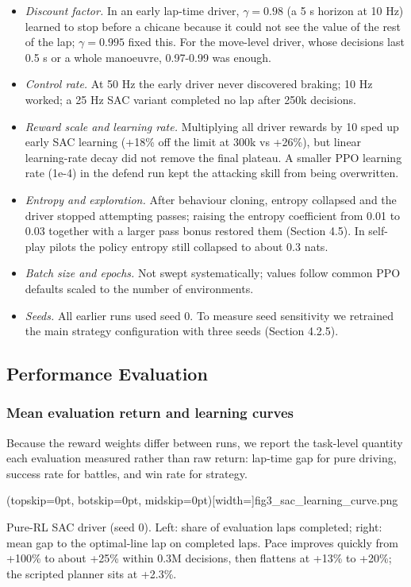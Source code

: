 \documentclass{ieeeaccess}
\providecommand{\tightlist}{\setlength{\itemsep}{0pt}\setlength{\parskip}{0pt}}
\begin{document}
\begin{itemize}
\tightlist
\item
  \emph{Discount factor.} In an early lap-time driver, \(\gamma=0.98\) (a 5 s horizon at
  10 Hz) learned to stop before a chicane because it could not see the value of the
  rest of the lap; \(\gamma=0.995\) fixed this. For the move-level driver, whose
  decisions last 0.5 s or a whole manoeuvre, 0.97-0.99 was enough.
\item
  \emph{Control rate.} At 50 Hz the early driver never discovered braking; 10 Hz worked;
  a 25 Hz SAC variant completed no lap after 250k decisions.
\item
  \emph{Reward scale and learning rate.} Multiplying all driver rewards by 10 sped up
  early SAC learning (+18\% off the limit at 300k vs +26\%), but linear learning-rate
  decay did not remove the final plateau. A smaller PPO learning rate (1e-4) in the
  defend run kept the attacking skill from being overwritten.
\item
  \emph{Entropy and exploration.} After behaviour cloning, entropy collapsed and the
  driver stopped attempting passes; raising the entropy coefficient from 0.01 to
  0.03 together with a larger pass bonus restored them (Section 4.5). In self-play
  pilots the policy entropy still collapsed to about 0.3 nats.
\item
  \emph{Batch size and epochs.} Not swept systematically; values follow common PPO
  defaults scaled to the number of environments.
\item
  \emph{Seeds.} All earlier runs used seed 0. To measure seed sensitivity we retrained
  the main strategy configuration with three seeds (Section 4.2.5).
\end{itemize}

\subsection{Performance Evaluation}

\subsubsection{Mean evaluation return and learning curves}

Because the reward weights differ between runs, we report the task-level quantity
each evaluation measured rather than raw return: lap-time gap for pure driving,
success rate for battles, and win rate for strategy.

\Figure[t!](topskip=0pt, botskip=0pt, midskip=0pt)[width=\textwidth]{fig3_sac_learning_curve.png}
{\parbox{0.92\textwidth}{Pure-RL SAC driver (seed 0). Left: share of evaluation laps completed; right: mean gap to the optimal-line lap on completed laps. Pace improves quickly from +100\% to about +25\% within 0.3M decisions, then flattens at +13\% to +20\%; the scripted planner sits at +2.3\%.}\label{fig:fig3_sac_learning_curve}}
\end{document}
